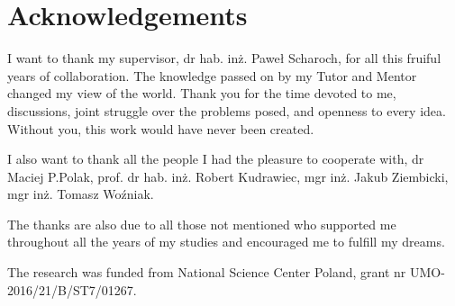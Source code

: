 \chapter*{Acknowledgements}

I want to thank my supervisor, dr hab. inż. Paweł Scharoch, for all this fruiful years of collaboration.
The knowledge passed on by my Tutor and Mentor changed my view of the world.
Thank you for the time devoted to me, discussions, joint struggle over the problems posed, and openness to every idea.
Without you, this work would have never been created.

I also want to thank all the people I had the pleasure to cooperate with,
dr Maciej P.Polak,
prof. dr hab. inż. Robert Kudrawiec,
mgr inż. Jakub Ziembicki,
mgr inż. Tomasz Woźniak.

The thanks are also due to all those not mentioned who supported me throughout all the years of my studies and encouraged me to fulfill my dreams. 

\ornament

\noindent
The research was funded from National Science Center Poland, grant nr UMO-2016/21/B/ST7/01267.

\cleardoublepage
